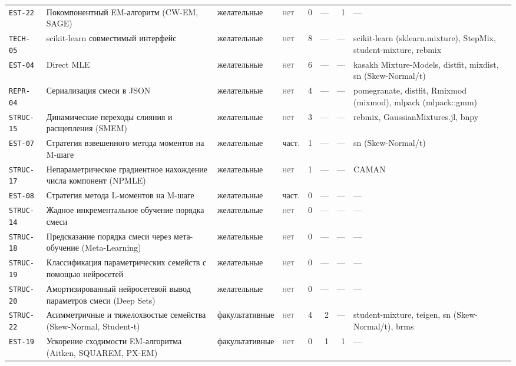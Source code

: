 \documentclass[10pt,a4paper]{article}
\begin{document}
\begin{landscape}
{\begin{longtable}{@{}l >{\raggedright\arraybackslash}p{8.2cm} l l r r r >{\raggedright\arraybackslash}p{6.2cm}@{}}
\texttt{EST-22} & Покомпонентный EM-алгоритм (CW-EM, SAGE) & желательные & \textcolor{gray}{нет} & 0 & --- & 1 & --- \\
\texttt{TECH-05} & scikit-learn совместимый интерфейс & желательные & \textcolor{gray}{нет} & 8 & --- & --- & scikit-learn (sklearn.mixture), StepMix, student-mixture, rebmix \\
\texttt{EST-04} & Direct MLE & желательные & \textcolor{gray}{нет} & 6 & --- & --- & kasakh Mixture-Models, distfit, mixdist, sn (Skew-Normal/t) \\
\texttt{REPR-04} & Сериализация смеси в JSON & желательные & \textcolor{gray}{нет} & 4 & --- & --- & pomegranate, distfit, Rmixmod (mixmod), mlpack (mlpack::gmm) \\
\texttt{STRUC-15} & Динамические переходы слияния и расщепления (SMEM) & желательные & \textcolor{gray}{нет} & 3 & --- & --- & rebmix, GaussianMixtures.jl, bnpy \\
\texttt{EST-07} & Стратегия взвешенного метода моментов на M-шаге & желательные & \cellcolor{part!40}част. & 1 & --- & --- & sn (Skew-Normal/t) \\
\texttt{STRUC-17} & Непараметрическое градиентное нахождение числа компонент (NPMLE) & желательные & \textcolor{gray}{нет} & 1 & --- & --- & CAMAN \\
\texttt{EST-08} & Стратегия метода L-моментов на M-шаге & желательные & \cellcolor{part!40}част. & 0 & --- & --- & --- \\
\texttt{STRUC-14} & Жадное инкрементальное обучение порядка смеси & желательные & \textcolor{gray}{нет} & 0 & --- & --- & --- \\
\texttt{STRUC-18} & Предсказание порядка смеси через мета-обучение (Meta-Learning) & желательные & \textcolor{gray}{нет} & 0 & --- & --- & --- \\
\texttt{STRUC-19} & Классификация параметрических семейств с помощью нейросетей & желательные & \textcolor{gray}{нет} & 0 & --- & --- & --- \\
\texttt{STRUC-20} & Амортизированный нейросетевой вывод параметров смеси (Deep Sets) & желательные & \textcolor{gray}{нет} & 0 & --- & --- & --- \\
\texttt{STRUC-22} & Асимметричные и тяжелохвостые семейства (Skew-Normal, Student-t) & факультативные & \textcolor{gray}{нет} & 4 & 2 & --- & student-mixture, teigen, sn (Skew-Normal/t), brms \\
\texttt{EST-19} & Ускорение сходимости EM-алгоритма (Aitken, SQUAREM, PX-EM) & факультативные & \textcolor{gray}{нет} & 0 & 1 & 1 & --- \\

\end{longtable}}
\end{landscape}
\end{document}
